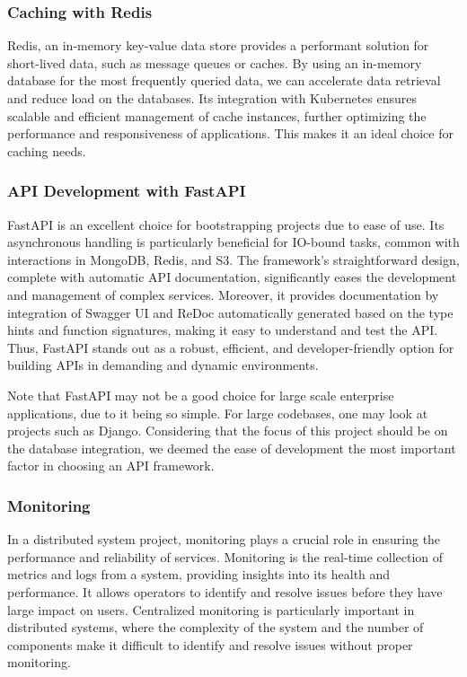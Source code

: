 \documentclass{report}
\begin{document}
    \subsubsection{Caching with Redis}
    Redis, an in-memory key-value data store provides a performant solution for short-lived data, such as message queues or caches. By using an in-memory database for the most frequently queried data, we can accelerate data retrieval and reduce load on the databases. Its integration with Kubernetes ensures scalable and efficient management of cache instances, further optimizing the performance and responsiveness of applications. This makes it an ideal choice for caching needs.

    \subsubsection{API Development with FastAPI}
    FastAPI is an excellent choice for bootstrapping projects due to ease of use. Its asynchronous handling is particularly beneficial for IO-bound tasks, common with interactions in MongoDB, Redis, and S3. The framework's straightforward design, complete with automatic API documentation, significantly eases the development and management of complex services. Moreover, it provides documentation by integration of Swagger UI and ReDoc automatically generated based on the type hints and function signatures, making it easy to understand and test the API. Thus, FastAPI stands out as a robust, efficient, and developer-friendly option for building APIs in demanding and dynamic environments.

    Note that FastAPI may not be a good choice for large scale enterprise applications, due to it being so simple. For large codebases, one may look at projects such as Django. Considering that the focus of this project should be on the database integration, we deemed the ease of development the most important factor in choosing an API framework.

    \subsubsection{Monitoring}
    In a distributed system project, monitoring plays a crucial role in ensuring the performance and reliability of services. Monitoring is the real-time collection of metrics and logs from a system, providing insights into its health and performance. It allows operators to identify and resolve issues before they have large impact on users. Centralized monitoring is particularly important in distributed systems, where the complexity of the system and the number of components make it difficult to identify and resolve issues without proper monitoring.
\end{document}
